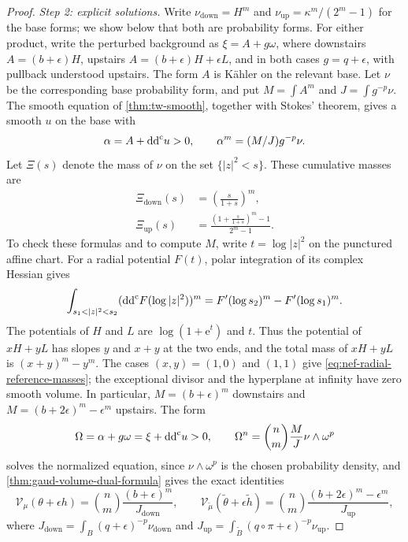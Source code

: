 \begin{proof}
\emph{Step 2: explicit solutions.} Write $\nu_{\mathrm{down}}=H^m$ and $\nu_{\mathrm{up}}=\kappa^m/(2^m-1)$ for the base forms; we show below that both are probability forms. For either product, write the perturbed background as $\xi=A+g\omega$, where downstairs $A=(b+\epsilon)H$, upstairs $A=(b+\epsilon)H+\epsilon L$, and in both cases $g=q+\epsilon$, with pullback understood upstairs. The form $A$ is K\"ahler on the relevant base. Let $\nu$ be the corresponding base probability form, and put $M=\int A^m$ and $J=\int g^{-p}\nu$. The smooth equation of \cref{thm:tw-smooth}, together with Stokes' theorem, gives a smooth $u$ on the base with
\[
 \alpha=A+\mathrm{dd}^{\mathrm{c}} u>0,\qquad \alpha^m=(M/J)g^{-p}\nu.
\]
Let $\Xi(s)$ denote the mass of $\nu$ on the set $\{|z|^2<s\}$. These cumulative masses are
\begin{equation}\label{eq:nef-radial-reference-masses}
 \begin{split}
 \Xi_{\mathrm{down}}(s)&=\left(\frac{s}{1+s}\right)^m,\\
 \Xi_{\mathrm{up}}(s)&=\frac{\left(1+\frac{s}{1+s}\right)^m-1}{2^m-1}.
 \end{split}
\end{equation}
To check these formulas and to compute $M$, write $t=\log|z|^2$ on the punctured affine chart. For a radial potential $F(t)$, polar integration of its complex Hessian gives
\[
 \int_{s_1<|z|^2<s_2}(\ddc F(\log|z|^2))^m
 =F'(\log s_2)^m-F'(\log s_1)^m.
\]
The potentials of $H$ and $L$ are $\log(1+\mathrm{e}^t)$ and $t$. Thus the potential of $xH+yL$ has slopes $y$ and $x+y$ at the two ends, and the total mass of $xH+yL$ is $(x+y)^m-y^m$. The cases $(x,y)=(1,0)$ and $(1,1)$ give \eqref{eq:nef-radial-reference-masses}; the exceptional divisor and the hyperplane at infinity have zero smooth volume. In particular, $M=(b+\epsilon)^m$ downstairs and $M=(b+2\epsilon)^m-\epsilon^m$ upstairs. The form
\begin{equation}\label{eq:nef-balanced-product-power}
 \Omega=\alpha+g\omega=\xi+\mathrm{dd}^{\mathrm{c}} u>0,\qquad
\Omega^n=\binom{n}{m}\frac{M}{J}\nu\wedge\omega^p
\end{equation}
solves the normalized equation, since $\nu\wedge\omega^p$ is the chosen probability density, and \cref{thm:gaud-volume-dual-formula} gives the exact identities
\begin{equation}\label{eq:nef-strict-blowup-volumes}
 \mathcal V_\mu(\theta+\epsilon h)
 =\binom{n}{m}\frac{(b+\epsilon)^m}{J_{\mathrm{down}}},
 \qquad
 \mathcal V_{\widetilde\mu}(\widetilde\theta+\epsilon\widetilde h)
 =\binom{n}{m}
 \frac{(b+2\epsilon)^m-\epsilon^m}{J_{\mathrm{up}}},
\end{equation}
where $J_{\mathrm{down}}=\int_B(q+\epsilon)^{-p}\nu_{\mathrm{down}}$ and $J_{\mathrm{up}}=\int_{\widetilde B}(q\circ\pi+\epsilon)^{-p}\nu_{\mathrm{up}}$.


\end{proof}
